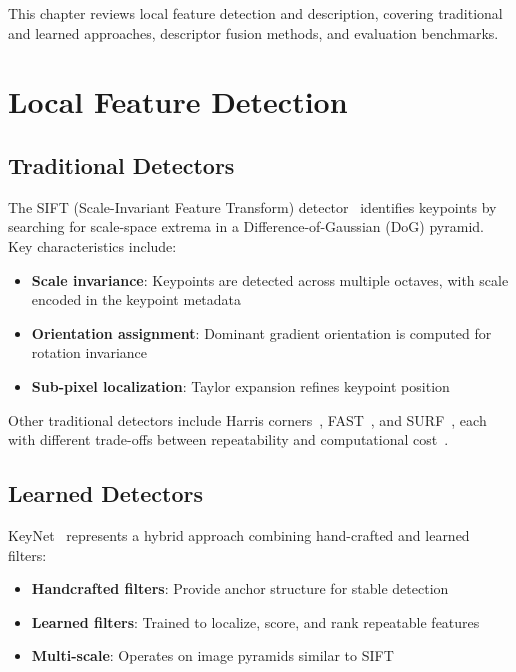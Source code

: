 
This chapter reviews local feature detection and description, covering traditional and learned approaches, descriptor fusion methods, and evaluation benchmarks.

\section{Local Feature Detection}

\subsection{Traditional Detectors}

The SIFT (Scale-Invariant Feature Transform) detector~\cite{lowe2004distinctive} identifies keypoints by searching for scale-space extrema in a Difference-of-Gaussian (DoG) pyramid. Key characteristics include:

\begin{itemize}
    \item \textbf{Scale invariance}: Keypoints are detected across multiple octaves, with scale encoded in the keypoint metadata
    \item \textbf{Orientation assignment}: Dominant gradient orientation is computed for rotation invariance
    \item \textbf{Sub-pixel localization}: Taylor expansion refines keypoint position
\end{itemize}

Other traditional detectors include Harris corners~\cite{harris1988combined}, FAST~\cite{rosten2006machine}, and SURF~\cite{bay2006surf}, each with different trade-offs between repeatability and computational cost~\cite{lee2016survey}.

\subsection{Learned Detectors}

KeyNet~\cite{barroso2019key} represents a hybrid approach combining hand-crafted and learned filters:

\begin{itemize}
    \item \textbf{Handcrafted filters}: Provide anchor structure for stable detection
    \item \textbf{Learned filters}: Trained to localize, score, and rank repeatable features
    \item \textbf{Multi-scale}: Operates on image pyramids similar to SIFT
\end{itemize}

